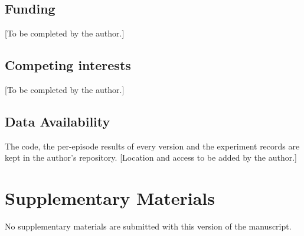 \documentclass{article}
\begin{document}
\subsection*{Funding}
[To be completed by the author.]

\subsection*{Competing interests}
[To be completed by the author.]

\subsection*{Data Availability}
The code, the per-episode results of every version and the experiment records are kept in the author's repository. [Location and access to be added by the author.]

\section*{Supplementary Materials}

No supplementary materials are submitted with this version of the manuscript.

\printbibliography
\end{document}
